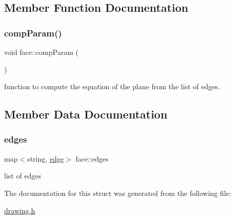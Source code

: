 \subsection{Member Function Documentation}
\mbox{\label{structface_a9824194eb850dd3b7495b959075e2e01}} 
\subsubsection{\texorpdfstring{comp\+Param()}{compParam()}}
{\footnotesize\ttfamily void face\+::comp\+Param (\begin{DoxyParamCaption}{ }\end{DoxyParamCaption})}

function to compute the equation of the plane from the list of edges. 

\subsection{Member Data Documentation}
\mbox{\label{structface_ac8a0c9860a641b73d3bbcdf18e18df14}} 
\subsubsection{\texorpdfstring{edges}{edges}}
{\footnotesize\ttfamily map$<$string, \mbox{\hyperlink{structedge}{edge}}$>$ face\+::edges}

list of edges 

The documentation for this struct was generated from the following file\+:\begin{DoxyCompactItemize}
\item 
\mbox{\hyperlink{drawing_8h}{drawing.\+h}}\end{DoxyCompactItemize}
